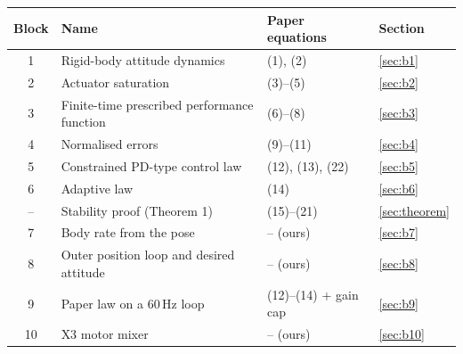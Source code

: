 \begin{center}\small
\begin{tabularx}{\linewidth}{@{}c l X l@{}}
\toprule
\textbf{Block} & \textbf{Name} & \textbf{Paper equations} & \textbf{Section}\\
\midrule
1 & Rigid-body attitude dynamics & (1), (2) & \ref{sec:b1}\\
2 & Actuator saturation & (3)--(5) & \ref{sec:b2}\\
3 & Finite-time prescribed performance function & (6)--(8) & \ref{sec:b3}\\
4 & Normalised errors & (9)--(11) & \ref{sec:b4}\\
5 & Constrained PD-type control law & (12), (13), (22) & \ref{sec:b5}\\
6 & Adaptive law & (14) & \ref{sec:b6}\\
-- & Stability proof (Theorem 1) & (15)--(21) & \ref{sec:theorem}\\
7 & Body rate from the pose & -- (ours) & \ref{sec:b7}\\
8 & Outer position loop and desired attitude & -- (ours) & \ref{sec:b8}\\
9 & Paper law on a 60\,Hz loop & (12)--(14) + gain cap & \ref{sec:b9}\\
10 & X3 motor mixer & -- (ours) & \ref{sec:b10}\\
\bottomrule
\end{tabularx}
\end{center}
